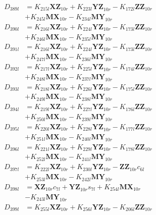 \begin{align}
D_{389l} &= K_{215l}\mathbf{XZ}_{10r} + K_{223l}\mathbf{YZ}_{10r} - K_{172l}\mathbf{ZZ}_{10r}  \nonumber \\
&+ K_{245l}\mathbf{MX}_{10r} - K_{234l}\mathbf{MY}_{10r} \nonumber \\
D_{390l} &= K_{216l}\mathbf{XZ}_{10r} + K_{224l}\mathbf{YZ}_{10r} - K_{173l}\mathbf{ZZ}_{10r}  \nonumber \\
&+ K_{246l}\mathbf{MX}_{10r} - K_{235l}\mathbf{MY}_{10r} \nonumber \\
D_{391l} &= K_{216l}\mathbf{XZ}_{10r} + K_{224l}\mathbf{YZ}_{10r} - K_{173l}\mathbf{ZZ}_{10r}  \nonumber \\
&+ K_{247l}\mathbf{MX}_{10r} - K_{236l}\mathbf{MY}_{10r} \nonumber \\
D_{392l} &= K_{217l}\mathbf{XZ}_{10r} + K_{225l}\mathbf{YZ}_{10r} - K_{174l}\mathbf{ZZ}_{10r}  \nonumber \\
&+ K_{248l}\mathbf{MX}_{10r} - K_{237l}\mathbf{MY}_{10r} \nonumber \\
D_{393l} &= K_{218l}\mathbf{XZ}_{10r} + K_{226l}\mathbf{YZ}_{10r} - K_{175l}\mathbf{ZZ}_{10r}  \nonumber \\
&+ K_{249l}\mathbf{MX}_{10r} - K_{238l}\mathbf{MY}_{10r} \nonumber \\
D_{394l} &= K_{219l}\mathbf{XZ}_{10r} + K_{227l}\mathbf{YZ}_{10r} - K_{176l}\mathbf{ZZ}_{10r}  \nonumber \\
&+ K_{250l}\mathbf{MX}_{10r} - K_{239l}\mathbf{MY}_{10r} \nonumber \\
D_{395l} &= K_{220l}\mathbf{XZ}_{10r} + K_{228l}\mathbf{YZ}_{10r} - K_{177l}\mathbf{ZZ}_{10r}  \nonumber \\
&+ K_{251l}\mathbf{MX}_{10r} - K_{240l}\mathbf{MY}_{10r} \nonumber \\
D_{396l} &= K_{221l}\mathbf{XZ}_{10r} + K_{229l}\mathbf{YZ}_{10r} - K_{178l}\mathbf{ZZ}_{10r}  \nonumber \\
&+ K_{252l}\mathbf{MX}_{10r} - K_{241l}\mathbf{MY}_{10r} \nonumber \\
D_{397l} &= K_{222l}\mathbf{XZ}_{10r} + K_{230l}\mathbf{YZ}_{10r} - \mathbf{ZZ}_{10r}c_{6l}  \nonumber \\
&+ K_{253l}\mathbf{MX}_{10r} - K_{242l}\mathbf{MY}_{10r} \nonumber \\
D_{398l} &= \mathbf{XZ}_{10r}c_{7l} + \mathbf{YZ}_{10r}s_{7l} + K_{254l}\mathbf{MX}_{10r}  \nonumber \\
&- K_{243l}\mathbf{MY}_{10r} \nonumber \\
D_{399l} &= K_{255l}\mathbf{XZ}_{10r} + K_{256l}\mathbf{YZ}_{10r} - K_{206l}\mathbf{ZZ}_{10r}  \nonumber \\

\end{align}
